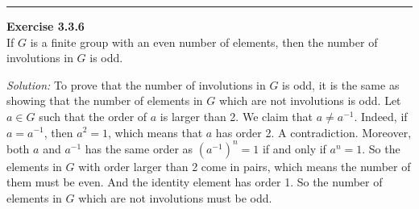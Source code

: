 \documentclass[a4paper, 12pt]{article}
\newenvironment{problem}[2][Exercise]
    { \begin{mdframed}[backgroundcolor=gray!20] \textbf{#1 #2} \\}
    {  \end{mdframed}}
\newenvironment{solution}
    {\textit{Solution:}}
    {}
\begin{document}
\noindent\rule{7in}{2.8pt}
\begin{problem}{3.3.6}
If \(G\) is a finite group with an even number of elements, then the number of involutions in \(G\) is odd.
\end{problem}
\begin{solution}
To prove that the number of involutions in \(G\) is odd, it is the same as showing that the number of elements in \(G\) which are not involutions is odd. 
Let \(a\in G\) such that the order of \(a\) is larger than 2. We claim that \(a\neq a^{-1}\). Indeed, if \(a=a^{-1}\), then \(a^2=1\), which means that \(a\) has order 2. A contradiction. 
Moreover, both \(a\) and \(a^{-1}\) has the same order as \((a^{-1})^n=1\) if and only if \(a^n=1\). So the elements in \(G\) with order larger than 2 come in pairs, which means the number of them must be even. 
And the identity element has order 1. So the number of elements in \(G\) which are not involutions must be odd. 
\end{solution}
\end{document}

